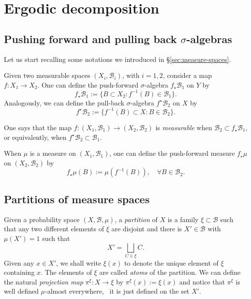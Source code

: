 \section{Ergodic decomposition}\label{sec:ergod-decomposition}

\subsection{Pushing forward and pulling back $\sigma$-algebras}
\label{sec:push-forw-pul-back-sigma-alg}

Let us start recalling some notations we introduced in \S\ref{sec:measure-spaces}.

Given two measurable spaces $(X_i,\mathscr{B}_i)$, with $i=1,2$, consider a map $f\colon X_1\to X_2$. One can define the push-forward $\sigma$-algebra $f_\star\mathscr{B}_1$ on $Y$ by
\begin{displaymath}
  f_\star\mathscr{B}_1:=\{B\subset X_2\colon f^{-1}(B)\in\mathscr{B}_1\}.
\end{displaymath}
Analogously, we can define the pull-back $\sigma$-algebra $f^\star\mathscr{B}_2$ on $X$ by
\begin{displaymath}
  f^\star\mathscr{B}_2:=\{f^{-1}(B)\subset X \colon B\in\mathscr{B}_2\}.
\end{displaymath}

One says that the map $f\colon (X_1,\mathscr{B}_1)\to (X_2,\mathscr{B}_2)$ is \emph{measurable} when $\mathscr{B}_2\subset f_\star\mathscr{B}_1$, or equivalently, when $f^\star\mathscr{B}_2\subset \mathscr{B}_1$.

When $\mu$ is a measure on $(X_1,\mathscr{B}_1)$, one can define the push-forward measure $f_\star\mu$ on $(X_2,\mathscr{B}_2)$ by
\begin{displaymath}
  f_\star\mu(B):=\mu(f^{-1}(B)),\quad \forall B\in\mathscr{B}_2.
\end{displaymath}


\subsection{Partitions of measure spaces}\label{sec:partitions-measure-spaces}

Given a probability space $(X,\mathscr{B},\mu)$, a \emph{partition} of $X$ is a family $\xi\subset\mathscr{B}$ such that any two different elements of $\xi$ are disjoint and there is $X'\in\mathscr{B}$ with $\mu(X')=1$ such that
\begin{displaymath}
  X'=\bigsqcup_{C\in\xi} C.
\end{displaymath}
Given any $x\in X'$, we shall write $\xi(x)$ to denote the unique element of $\xi$ containing $x$. The elements of $\xi$ are called \emph{atoms} of the partition. We can define the natural \emph{projection map} $\pi^{\xi}\colon X\to\xi$ by $\pi^{\xi}(x):=\xi(x)$ and notice that $\pi^{\xi}$ is well defined $\mu$-almost everywhere, \ie~it is just defined on the set $X'$.

